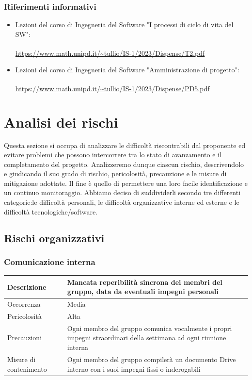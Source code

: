 \documentclass{article}
\begin{document}
\subsubsection{Riferimenti informativi}
\begin{itemize}
\item Lezioni del corso di Ingegneria del Software "I processi di ciclo di vita del SW": \\ \\
\url{https://www.math.unipd.it/~tullio/IS-1/2023/Dispense/T2.pdf} 
\item Lezioni del corso di Ingegneria del Software "Amministrazione di progetto": \\ \\
\url{https://www.math.unipd.it/~tullio/IS-1/2023/Dispense/PD5.pdf}
\end{itemize}

\section{Analisi dei rischi}
Questa sezione si occupa di analizzare le difficoltà riscontrabili dal proponente ed evitare problemi che possono intercorrere tra lo stato di avanzamento e il completamento del progetto. Analizzeremo dunque ciascun rischio, descrivendolo e giudicando il suo grado di rischio, pericolosità, precauzione e le misure di mitigazione adottate. Il fine è quello di permettere una loro facile identificazione e un continuo monitoraggio. Abbiamo deciso di suddividerli secondo tre differenti categorie:le difficoltà personali, le difficoltà organizzative interne ed esterne e le difficoltà tecnologiche/software.

\subsection{Rischi organizzativi}
\subsubsection{Comunicazione interna}
\begin{center}
\begin{tabular}{|P{10em} |P{20em}|} 
\hline
     Descrizione & Mancata reperibilità sincrona dei membri del gruppo, data da eventuali impegni personali\\ 
     \hline
    Occorrenza & Media\\
    \hline
    Pericolosità & Alta \\
    \hline
    Precauzioni & Ogni membro del gruppo comunica vocalmente i propri impegni straordinari della settimana ad ogni riunione interna \\
    \hline
    Misure di contenimento & Ogni membro del gruppo compilerà un documento Drive interno  con i suoi impegni fissi o inderogabili \\
    \hline
\end{tabular}
\label{tab:cominterna}
\end{center}
\end{document}
